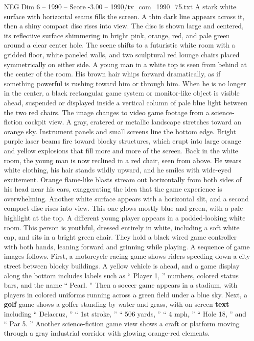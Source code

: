 \begin{textsample}{NEG Dim 6 – 1990 – Score -3.00 – 1990/tv\_com\_1990\_75.txt}  \label{ex:f6_neg_021}
A stark white surface with horizontal seams fills the screen.
A thin dark line appears across it, then a shiny compact disc rises into view.
The disc is shown large and centered, its reflective surface shimmering in bright pink, orange, red, and pale green around a clear center hole.
The scene shifts to a futuristic white room with a gridded floor, white paneled walls, and two sculptural red lounge chairs placed symmetrically on either side.
A young man in a white top is seen from behind at the center of the room.
His brown hair whips forward dramatically, as if something powerful is rushing toward him or through him.
When he is no longer in the center, a black rectangular game system or monitor-like object is visible ahead, suspended or displayed inside a vertical column of pale blue light between the two red chairs.
The image changes to video game footage from a science-fiction cockpit view.
A gray, cratered or metallic landscape stretches toward an orange sky.
Instrument panels and small screens line the bottom edge.
Bright purple laser beams fire toward blocky structures, which erupt into large orange and yellow explosions that fill more and more of the screen.
Back in the white room, the young man is now reclined in a red chair, seen from above.
He wears white clothing, his hair stands wildly upward, and he smiles with wide-eyed excitement.
Orange flame-like blasts stream out horizontally from both sides of his head near his ears, exaggerating the idea that the game experience is overwhelming.
Another white surface appears with a horizontal slit, and a second compact disc rises into view.
This one glows mostly blue and green, with a pale highlight at the top.
A different young player appears in a padded-looking white room.
This person is youthful, dressed entirely in white, including a soft white cap, and sits in a bright green chair.
They hold a black wired game controller with both hands, leaning forward and grinning while playing.
A sequence of game images follows.
First, a motorcycle racing game shows riders speeding down a city street between blocky buildings.
A yellow vehicle is ahead, and a game display along the bottom includes labels such as “ Player 1, ” numbers, colored status bars, and the name “ Pearl. ” Then a soccer game appears in a stadium, with players in colored uniforms running across a green field under a blue sky.
Next, a \textbf{golf} game shows a golfer standing by water and grass, with on-screen \textbf{text} including “ Delacruz, ” “ 1st stroke, ” “ 506 yards, ” “ 4 mph, ” “ Hole 18, ” and “ Par 5. ” Another science-fiction game view shows a craft or platform moving through a gray industrial corridor with glowing orange-red elements.

\end{textsample}
